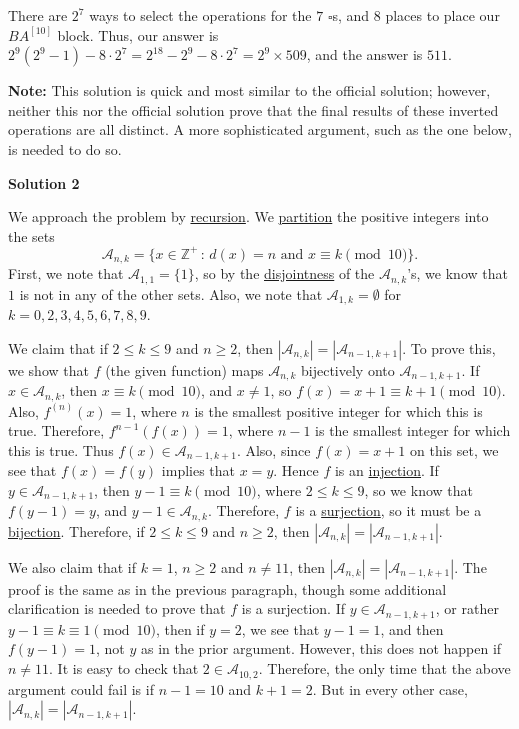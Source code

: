 \begin{enumerate}
 There are $2^7$ ways to select the operations for the $7$ $\square$s, and $8$ places to place our $BA^{[10]}$ block. Thus, our answer is $2^9(2^9-1)-8\cdot 2^7 = 2^{18} - 2^9 - 8 \cdot 2^7 = 2^9 \times 509$, and the answer is $\boxed{511}$.

 \textbf{Note:} This solution is quick and most similar to the official solution; however, neither this nor the official solution prove that the final results of these inverted operations are all distinct. A more sophisticated argument, such as the one below, is needed to do so.

 



\textbf{Solution 2}

We approach the problem by \href{https://artofproblemsolving.com/wiki/index.php?title=Recursion}{recursion}. We \href{https://artofproblemsolving.com/wiki/index.php?title=Partition}{partition} the positive integers into the sets
 \[\mathcal{A}_{n,k}=\{x\in\mathbb{Z}^+\,:\, d(x)=n\text{ and } x\equiv k\pmod{10}\}.\]First, we note that $\mathcal{A}_{1,1}=\{1\}$, so by the \href{https://artofproblemsolving.com/wiki/index.php?title=Disjoint}{disjointness} of the $\mathcal{A}_{n,k}$'s, we know that $1$ is not in any of the other sets. Also, we note that $\mathcal{A}_{1,k}=\emptyset$ for $k=0,2,3,4,5,6,7,8,9$.

 We claim that if $2\le k\le 9$ and $n\ge2$, then $|\mathcal{A}_{n,k}|=|\mathcal{A}_{n-1,k+1}|$. To prove this, we show that $f$ (the given function) maps $\mathcal{A}_{n,k}$ bijectively onto $\mathcal{A}_{n-1,k+1}$. If $x\in \mathcal{A}_{n,k}$, then $x\equiv k\pmod{10}$, and $x\ne 1$, so $f(x)=x+1\equiv k+1\pmod{10}$. Also, $f^{(n)}(x)=1$, where $n$ is the smallest positive integer for which this is true. Therefore, $f^{{n-1}}(f(x))=1$, where $n-1$ is the smallest integer for which this is true. Thus $f(x)\in\mathcal{A}_{n-1,k+1}$. Also, since $f(x)=x+1$ on this set, we see that $f(x)=f(y)$ implies that $x=y$. Hence $f$ is an \href{https://artofproblemsolving.com/wiki/index.php?title=Injection}{injection}. If $y\in\mathcal{A}_{n-1,k+1}$, then $y-1\equiv k\pmod{10}$, where $2\le k\le 9$, so we know that $f(y-1)=y$, and $y-1\in \mathcal{A}_{n,k}$. Therefore, $f$ is a \href{https://artofproblemsolving.com/wiki/index.php?title=Surjection}{surjection}, so it must be a \href{https://artofproblemsolving.com/wiki/index.php?title=Bijection}{bijection}. Therefore,  if $2\le k\le 9$ and $n\ge2$, then $|\mathcal{A}_{n,k}|=|\mathcal{A}_{n-1,k+1}|$.

 We also claim that if $k=1$, $n\ge 2$ and $n\ne 11$, then  $|\mathcal{A}_{n,k}|=|\mathcal{A}_{n-1,k+1}|$. The proof is the same as in the previous paragraph, though some additional clarification is needed to prove that $f$ is a surjection. If $y\in\mathcal{A}_{n-1,k+1}$, or rather $y-1\equiv k\equiv 1\pmod{10}$, then if $y=2$, we see that $y-1=1$, and then $f(y-1)=1$, not $y$ as in the prior argument. However, this does not happen if $n\ne 11$. It is easy to check that $2\in\mathcal{A}_{10,2}$. Therefore, the only time that the above argument could fail is if $n-1=10$ and $k+1=2$. But in every other case, $|\mathcal{A}_{n,k}|=|\mathcal{A}_{n-1,k+1}|$.


\end{enumerate}
